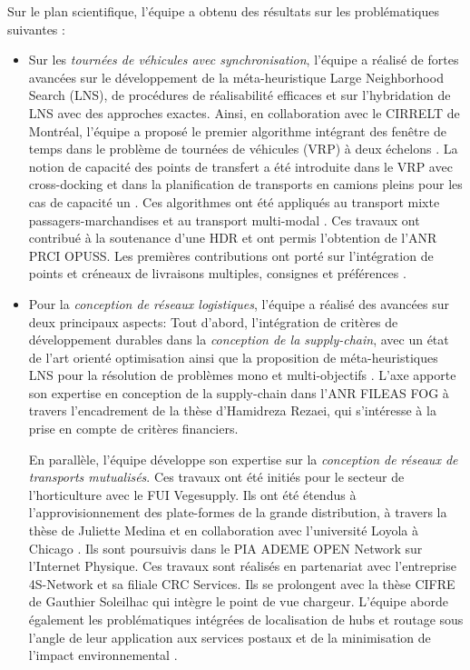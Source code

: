 Sur le plan scientifique, l'équipe a obtenu des résultats sur les problématiques suivantes : 
\begin{itemize}
	\item Sur les \textit{tournées de véhicules avec synchronisation}, l'équipe a réalisé de fortes avancées sur le développement de la méta-heuristique Large Neighborhood Search (LNS), de procédures de réalisabilité efficaces et sur l'hybridation de LNS avec des approches exactes. Ainsi, en collaboration avec le CIRRELT de Montréal, l'équipe a proposé le premier algorithme intégrant des fenêtre de temps dans le problème de tournées de véhicules (VRP) à deux échelons \cite{grangier:tel-01254445}. La notion de capacité des points de transfert a été introduite dans le VRP avec cross-docking \cite{grangier:hal-01499170,grangier:hal-02277261} et dans la planification de transports en camions pleins pour les cas de capacité un \cite{grimault:hal-01543503,grimault:tel-01343199}. Ces algorithmes ont été appliqués au transport mixte passagers-marchandises et au transport multi-modal \cite{masson:hal-01068305}.
	Ces travaux ont contribué à la soutenance d'une HDR \cite{lehuede:tel-01441778} et ont permis l'obtention de l'ANR PRCI OPUSS. Les premières contributions ont porté sur l'intégration de points et créneaux de livraisons multiples, consignes et préférences  \cite{dumez:hal-02452252}.
	\item Pour la \textit{conception de réseaux logistiques}, l'équipe a réalisé des avancées sur deux principaux aspects: Tout d'abord, l'intégration de critères de développement durables dans la \textit{conception de la supply-chain}, avec un état de l'art orienté optimisation \cite{eskandarpour:hal-01154605} ainsi que la proposition de méta-heuristiques LNS pour la résolution de problèmes mono et multi-objectifs \cite{eskandarpour:hal-01433630, eskandarpour:hal-02407741}.
	L'axe apporte son expertise en conception de la supply-chain dans l'ANR FILEAS FOG à travers l'encadrement de la thèse d'Hamidreza Rezaei, qui s'intéresse à la prise en compte de critères financiers.

    En parallèle, l'équipe développe son expertise sur la \textit{conception de réseaux de transports mutualisés}. Ces travaux ont été initiés pour le secteur de l'horticulture \cite{tang:hal-01591618} avec le FUI Vegesupply. Ils ont été étendus à l'approvisionnement des plate-formes de la grande distribution, à travers la thèse de Juliette Medina \cite{medina:tel-01460708} et en collaboration avec l'université Loyola à Chicago \cite{medina:hal-01689718}. Ils sont poursuivis dans le PIA ADEME OPEN Network sur l'Internet Physique. Ces travaux sont réalisés en partenariat avec l'entreprise 4S-Network et sa filiale CRC Services. Ils se prolongent avec la thèse CIFRE de Gauthier Soleilhac qui intègre le point de vue chargeur. 
    L'équipe aborde également les problématiques intégrées de localisation de hubs et routage sous l'angle de leur application aux services postaux \cite{bostel:hal-01320357,yang:hal-02524875} et de la minimisation de l'impact environnemental \cite{yang:these}.
    

\end{itemize}
